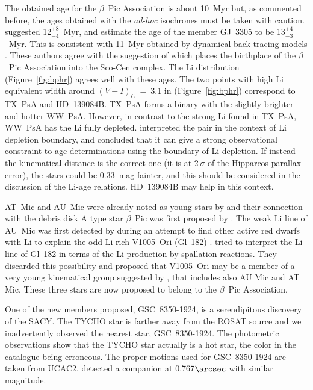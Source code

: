 \documentclass[11pt,twoside]{book}
\begin{document}
The obtained age for the $\beta$~Pic Association is about 10~Myr but,
as commented before, the ages obtained with the  {\it ad-hoc} isochrones
must be taken with caution.
\cite{zuckerman01a} suggested 12$^{+8}_{-4}$~Myr, and \cite{feige06}
estimate the age of the member {GJ~3305} to be  13$^{+4}_{-3}$~Myr.
This is consistent with 11~Myr  obtained by dynamical back-tracing models
\citep{ortega02, ortega04, song03}.
These authors agree with the suggestion of \cite{mamajekasp} which places
the  birthplace of the $\beta$~Pic Association into the Sco-Cen complex.
The Li distribution (Figure~\ref{fig:bphr}) agrees well with these ages.
The two points with high Li equivalent width around $(V-I)_C$~=~3.1 in
(Figure~\ref{fig:bphr}) correspond to TX~PsA and HD~139084B.
TX~PsA forms a binary with the slightly brighter and hotter WW~PsA.
However, in contrast to the strong Li found in TX~PsA, WW~PsA has the Li fully depleted.
\citet{song02} interpreted the pair in the context of Li depletion boundary, and
concluded that it can give a strong observational constraint to age determinations using
the boundary of Li depletion.
If instead the kinematical distance is the correct one (it is at 2\,$\sigma$ of
the Hipparcos parallax error),
the stars could be 0.33~mag fainter,
and this should be considered in the discussion of the Li-age relations.
HD~139084B may help in this context.

AT~Mic and AU~Mic were already noted as young stars by \citet{eggen1968}
and their connection with the debris disk A type star $\beta$~Pic was first proposed by \citet{barrado99}.
The weak Li line of AU~Mic was  first detected by \citet{delareza81}
during an attempt to find other active  red dwarfs with Li
to explain the odd Li-rich V1005~Ori (Gl~182) \citep{bopp74}.
\citet{delareza81} tried to interpret the Li line of Gl~182 in terms of the Li production
by spallation reactions.
They discarded this possibility and proposed that V1005~Ori may be a member of a
very young kinematical group
suggested by \citet{kunkel75}, that includes also AU Mic and AT Mic.
These three stars are now proposed to belong to the $\beta$~Pic Association.

One of the new members proposed, GSC~8350-1924, is a  serendipitous  discovery
of the SACY. The TYCHO star is farther away from the ROSAT source and
we inadvertently observed the nearest star, GSC~8350-1924. The photometric observations
show that the TYCHO star actually is a hot star, the color in the catalogue
being erroneous. The proper motions used for GSC~8350-1924 are taken from UCAC2.
\citet{nuria08a} detected a companion at 0.767$\arcsec$ with similar magnitude.
\end{document}
